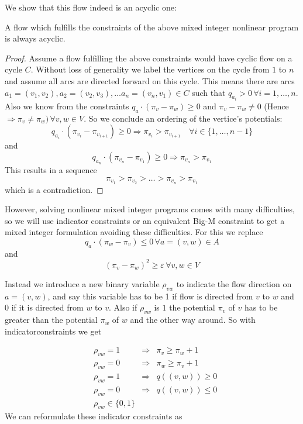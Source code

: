 We show that this flow indeed is an acyclic one:

\begin{prop}
 A flow which fulfills the constraints of the above mixed integer nonlinear program is always acyclic.
\end{prop}
\begin{proof}
 Assume a flow fulfilling the above constraints would have cyclic flow on a cycle $C$. Without loss of generality 
we label the vertices on the cycle from $1$ to $n$ and assume all arcs are directed forward on this cycle. This means 
there are arcs $a_1=(v_1,v_2),a_2=(v_2,v_3), \dots a_n=(v_n, v_1)\in C$ such that $q_{a_i} > 0 \,\forall i={1,\dots , 
n}$. Also we know from the constraints  $q_a\cdot (\pi_v -\pi_w)\ge 0$ and $\pi_v - \pi_w \neq 0$ (Hence $\Rightarrow 
\pi_v\neq\pi_w)\, \forall v,w\in V$. So we conclude an ordering of the vertice's potentials: 
$$q_{a_i}\cdot (\pi_{v_i} -\pi_{v_{i+1}})\ge 0 \Rightarrow \pi_{v_i}>\pi_{v_{i+1}}\quad\forall i\in\{1,\dots ,n-1\}$$ 
and 
$$q_{a_n}\cdot (\pi_{v_n} -\pi_{v_1})\ge 0 \Rightarrow \pi_{v_n}>\pi_{v_1}$$ 
This results in a sequence $$\pi_{v_1}>\pi_{v_2}>\dots >\pi_{v_n}>\pi_{v_1}$$ which is a contradiction. \Lightning
\end{proof}

However, solving nonlinear mixed integer programs comes with many difficulties, so we will use indicator constraints 
or an equivalent Big-M constraint to get a mixed integer formulation avoiding these difficulties. For this we  replace 
$$q_a\cdot (\pi_w -\pi_v)\le 0 \,\forall a=(v,w)\in A $$ and $$(\pi_v - \pi_w)^2 \ge \varepsilon \,\forall v,w \in V$$

Instead we introduce a new binary variable $\rho_{vw}$ to indicate the flow direction on $a=(v,w)$, and say this 
variable has to be 1 if flow is directed from $v$ to $w$ and 0 if it is directed from $w$ to $v$. Also if $\rho_{vw}$ 
is $1$ the potential $\pi_v$ of $v$ has to be greater than the potential $\pi_w$ of $w$ and the other way around. So 
with indicatorconstraints we get 

\begin{align*}
 &\rho_{vw}=1 &\Rightarrow &\pi_v\ge\pi_w +1\\
 &\rho_{vw}=0 &\Rightarrow &\pi_w\ge\pi_v +1\\
 &\rho_{vw}=1 &\Rightarrow &q((v,w))\ge 0\\
 &\rho_{vw}=0 &\Rightarrow &q((v,w))\le 0\\
 &\rho_{vw} \in \{0,1\}&&
\end{align*}
We can reformulate these indicator constraints as

